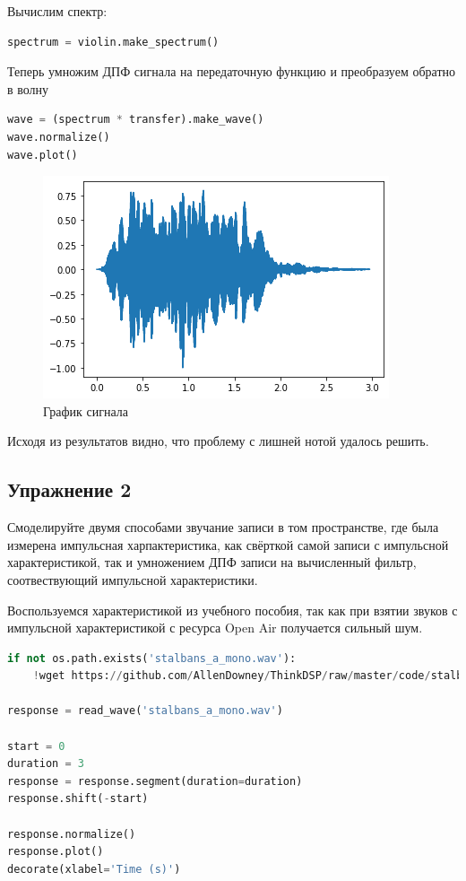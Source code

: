 Вычислим спектр:

\begin{lstlisting}[language=Python]
spectrum = violin.make_spectrum()
\end{lstlisting}

Теперь умножим ДПФ сигнала на передаточную функцию и преобразуем обратно в волну

\begin{lstlisting}[language=Python]
wave = (spectrum * transfer).make_wave()
wave.normalize()
wave.plot()
\end{lstlisting}

\begin{figure}[H]
	\begin{center}
		\includegraphics[scale=1]{fig/lab10/lab10_04.png}
		\caption{График сигнала}
	\end{center}
\end{figure}

Исходя из результатов видно, что проблему с лишней нотой удалось решить.

\subsection{Упражнение 2}

Смоделируйте двумя способами звучание записи в том пространстве, где была измерена импульсная харпактеристика, как свёрткой самой записи с импульсной характеристикой, так и умножением ДПФ записи на вычисленный фильтр, соотвествующий импульсной характеристики.

Воспользуемся характеристикой из учебного пособия, так как при взятии звуков с импульсной характеристикой с ресурса Open Air получается сильный шум.

\begin{lstlisting}[language=Python]
if not os.path.exists('stalbans_a_mono.wav'):
    !wget https://github.com/AllenDowney/ThinkDSP/raw/master/code/stalbans_a_mono.wav

response = read_wave('stalbans_a_mono.wav')

start = 0
duration = 3
response = response.segment(duration=duration)
response.shift(-start)

response.normalize()
response.plot()
decorate(xlabel='Time (s)')
\end{lstlisting}

